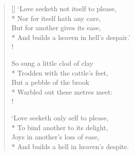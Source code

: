 \documentclass[MAIN]{subfiles}
\begin{document}
\settowidth{\versewidth}{\vin And builds a heaven in hell's despair.'}
\begin{verse}[\versewidth]
`Love seeketh not itself to please,\\*
\vin Nor for itself hath any care,\\
But for another gives its ease,\\*
\vin And builds a heaven in hell's despair.'\\!

So sung a little clod of clay\\*
\vin Trodden with the cattle's feet,\\
But a pebble of the brook\\*
\vin Warbled out these metres meet:\\!

`Love seeketh only self to please,\\*
\vin To bind another to its delight,\\
Joys in another's loss of ease,\\*
\vin And builds a hell in heaven's despite.
\end{verse}
\end{document}
